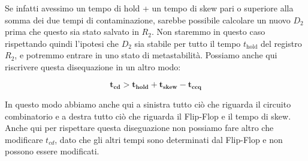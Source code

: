 \documentclass[11pt, a4paper, titlepage, oneside]{scrbook}
\begin{document}
Se infatti avessimo un tempo di hold + un tempo di skew pari o superiore alla somma dei due tempi di contaminazione, sarebbe possibile calcolare un nuovo $D_2$ prima che questo sia stato salvato in $R_2$. Non staremmo in questo caso rispettando quindi l'ipotesi che $D_2$ sia stabile per tutto il tempo $t_{\text{hold}}$ del registro $R_2$, e potremmo entrare in uno stato di metastabilità. Possiamo anche qui riscrivere questa disequazione in un altro modo:

\[
\bm{t_{cd} > t_{\textbf{hold}} + t_{\textbf{skew}} - t_{ccq}}
\]

In questo modo abbiamo anche qui a sinistra tutto ciò che riguarda il circuito combinatorio e a destra tutto ciò che riguarda il Flip-Flop e il tempo di skew. Anche qui per rispettare questa diseguazione non possiamo fare altro che modificare $t_{cd}$, dato che gli altri tempi sono determinati dal Flip-Flop e non possono essere modificati.
\end{document}
